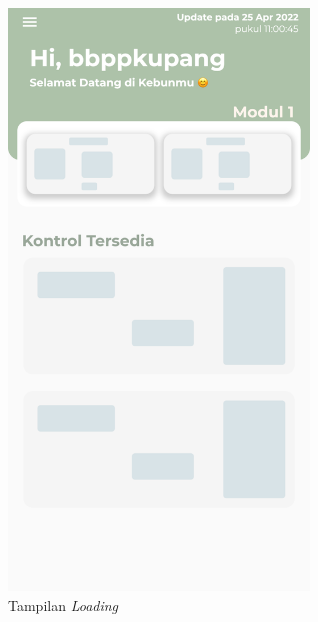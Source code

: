 \begin{flushleft}
\begin{justify}
\begin{enumerate}
\begin{itemize}
\begin{figure}[ht]
                    \includegraphics[width=8cm]{images/bab 4/ui-loading.png}
                    \caption{Tampilan \emph{Loading}}
                \end{figure}

            \end{itemize}
        \end{enumerate}

        \vspace{10cm}

\end{justify}
\end{flushleft}
